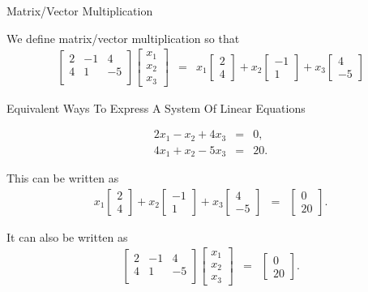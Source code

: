 \documentclass[svgnames,table,,aspectratio=169]{beamer}
\newcommand{\columnVector}[1]{%
  \left[
    \begin{array}{r}
    #1                           
    \end{array}
  \right]
}
\begin{document}
\begin{frame}{Matrix/Vector Multiplication}

  We define matrix/vector multiplication so that
  \begin{eqnarray*}
  \left[
    \begin{array}{rrr}
      2 & -1 &  4 \\
      4 &  1 & -5 \\
    \end{array}
    \right]
    \columnVector{x_1 \\ x_2 \\ x_3}
    & = &
      x_1 \columnVector{ 2 \\ 4} +
      x_2 \columnVector{-1 \\ 1} +
      x_3 \columnVector{4 \\ -5}              
  \end{eqnarray*}
  
\end{frame}

\begin{frame}{Equivalent Ways To Express A System Of Linear Equations}

    \begin{eqnarray*}
    2 x_1 - x_2 + 4 x_3 & = & 0, \\
    4 x_1 + x_2 - 5 x_3 & = & 20.
  \end{eqnarray*}

  This can be written as
  \begin{eqnarray*}
    x_1 \columnVector{ 2 \\ 4} +
    x_2 \columnVector{-1 \\ 1} +
    x_3 \columnVector{4 \\ -5}
    & = &
          \columnVector{0 \\ 20}.
  \end{eqnarray*}

  It can also be written as 
  \begin{eqnarray*}
    \left[
    \begin{array}{rrr}
      2 & -1 &  4 \\
      4 &  1 & -5 \\
    \end{array}
    \right]
    \columnVector{x_1 \\ x_2 \\ x_3}
    & = &
    \columnVector{0 \\ 20}.
  \end{eqnarray*}


\end{frame}
\end{document}
